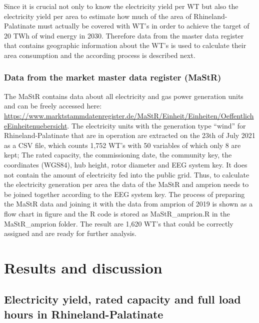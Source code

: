 \documentclass[a4paper,11pt]{article}
\begin{document}
Since it is crucial not only to know the electricity yield per WT but also the electricity yield per area to estimate how much of the area of Rhineland-Palatinate must actually be covered with WT's in order to achieve the target of 20 TWh of wind energy in 2030. Therefore data from the master data register that contains geographic information about the WT's is used to calculate their area consumption and the according process is described next.

\hypertarget{data-from-the-market-master-data-register-mastr}{%
\subsubsection{Data from the market master data register (MaStR)}\label{data-from-the-market-master-data-register-mastr}}

The MaStR contains data about all electricity and gas power generation units and can be freely accessed here: \url{https://www.marktstammdatenregister.de/MaStR/Einheit/Einheiten/OeffentlicheEinheitenuebersicht}. The electricity units with the generation type ``wind'' for Rhineland-Palatinate that are in operation are extracted on the 23th of July 2021 as a CSV file, which counts 1,752 WT's with 50 variables of which only 8 are kept; The rated capacity, the commissioning date, the community key, the coordinates (WGS84), hub height, rotor diameter and EEG system key. It does not contain the amount of electricity fed into the public grid. Thus, to calculate the electricity generation per area the data of the MaStR and amprion needs to be joined together according to the EEG system key. The process of preparing the MaStR data and joining it with the data from amprion of 2019 is shown as a flow chart in figure and the R code is stored as MaStR\_amprion.R in the MaStR\_amprion folder. The result are 1,620 WT's that could be correctly assigned and are ready for further analysis.

\hypertarget{results-and-discussion}{%
\section{Results and discussion}\label{results-and-discussion}}

\hypertarget{electricity-yield-rated-capacity-and-full-load-hours-in-rhineland-palatinate}{%
\subsection{Electricity yield, rated capacity and full load hours in Rhineland-Palatinate}\label{electricity-yield-rated-capacity-and-full-load-hours-in-rhineland-palatinate}}
\end{document}
